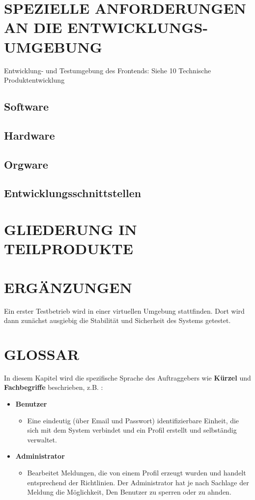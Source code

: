 	
	\section{\Large SPEZIELLE ANFORDERUNGEN AN DIE ENTWICKLUNGS-UMGEBUNG}
	Entwicklung- und Testumgebung des Frontends: Siehe 10 Technische Produktentwicklung 
	\subsection{Software}
	\subsection{Hardware}
	\subsection{Orgware}
	\subsection{Entwicklungsschnittstellen}
	
	
	\section{\Large GLIEDERUNG IN TEILPRODUKTE}
	
	
	\section{\Large ERGÄNZUNGEN}
	Ein erster Testbetrieb wird in einer virtuellen Umgebung stattfinden. Dort wird dann zunächst ausgiebig die Stabilität und Sicherheit des Systems getestet.
	
	
	\section{\Large GLOSSAR}
	
	In diesem Kapitel wird die spezifische Sprache des Auftraggebers wie \textbf{ Kürzel } und \textbf{ Fachbegriffe } beschrieben, z.B. :
	\begin{itemize}
		\item \textbf{ Benutzer }
		\begin{itemize}
			\item Eine eindeutig (über Email und Passwort) identifizierbare Einheit, die sich mit dem System verbindet und ein Profil erstellt und selbständig verwaltet.
		\end{itemize}
	\end{itemize}
	\begin{itemize}
		\item \textbf{ Administrator }
		\begin{itemize}
			\item Bearbeitet Meldungen, die von einem Profil erzeugt wurden und handelt entsprechend der Richtlinien. Der Administrator hat je nach Sachlage der Meldung die Möglichkeit, Den Benutzer zu sperren oder zu ahnden.
		\end{itemize}
	\end{itemize}	